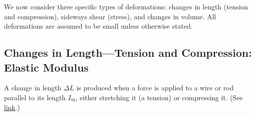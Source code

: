\documentclass[
]{book}
\begin{document}
We now consider three specific types of deformations: changes in length
(tension and compression), sideways shear (stress), and changes in
volume. All deformations are assumed to be small unless otherwise
stated.

\hypertarget{fs-id1165298672473}{}
\hypertarget{changes-in-lengthtension-and-compression-elastic-modulus}{%
\subsection{Changes in Length---Tension and Compression: Elastic Modulus}\label{changes-in-lengthtension-and-compression-elastic-modulus}}

A change in length \({\Delta L}{}\) is produced when a force is applied to
a wire or rod parallel to its length \(L_{0}{}\), either stretching it (a
tension) or compressing it. (See
\protect\hyperlink{import-auto-id1165298469619}{link}.)
\end{document}
